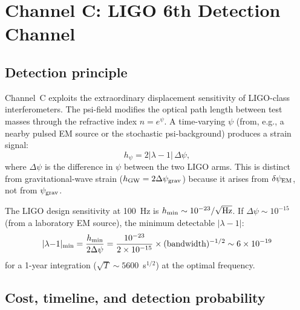 \documentclass[11pt]{article}
\newcommand{\ee}[1]{\times 10^{#1}}
\newcommand{\psigrav}{\psi_{\rm grav}}
\newcommand{\dpsiEM}{\delta\psi_{\rm EM}}
\newcommand{\lamdiff}{|\lambda{-}1|}
\begin{document}
\section{Channel C: LIGO 6th Detection Channel}
\label{sec:channel-C}

\subsection{Detection principle}

Channel~C exploits the extraordinary displacement sensitivity of LIGO-class
interferometers. The psi-field modifies the optical path length between
test masses through the refractive index $n = e^\psi$. A time-varying
$\psi$ (from, e.g., a nearby pulsed EM source or the stochastic
psi-background) produces a strain signal:
\begin{equation}
h_\psi = 2\lamdiff\,\Delta\psi,
\label{eq:h-psi}
\end{equation}
where $\Delta\psi$ is the difference in $\psi$ between the two LIGO arms.
This is distinct from gravitational-wave strain ($h_{\rm GW} = 2\Delta\psigrav$)
because it arises from $\dpsiEM$, not from $\psigrav$.

The LIGO design sensitivity at 100~Hz is $h_{\rm min} \sim 10^{-23}/\sqrt{\rm Hz}$.
If $\Delta\psi \sim 10^{-15}$ (from a laboratory EM source), the
minimum detectable $\lamdiff$:
\begin{equation}
\lamdiff_{\rm min} = \frac{h_{\rm min}}{2\Delta\psi}
= \frac{10^{-23}}{2\times 10^{-15}} \times (\text{bandwidth})^{-1/2}
\sim 6\ee{-19}
\label{eq:lam-LIGO}
\end{equation}
for a 1-year integration ($\sqrt{T} \sim 5600$~s$^{1/2}$) at the optimal
frequency.

\subsection{Cost, timeline, and detection probability}
\end{document}
